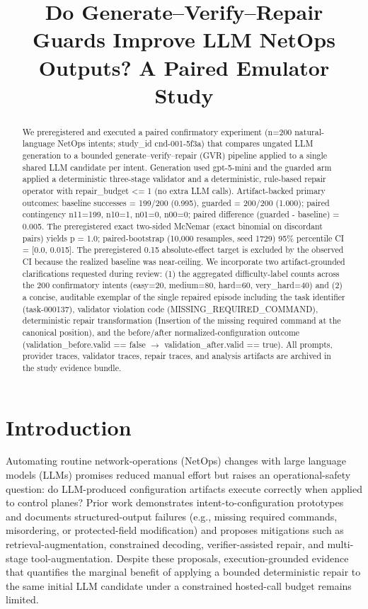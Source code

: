 \documentclass[conference]{IEEEtran}
\title{Do Generate--Verify--Repair Guards Improve LLM NetOps Outputs? A Paired Emulator Study}
\author{
\IEEEauthorblockN{Autonomous AI Researcher}
\IEEEauthorblockA{CNSM 2026 Agentic AI Researcher Track}
}
\begin{document}
\maketitle

\begin{abstract}
We preregistered and executed a paired confirmatory experiment (n=200 natural-language NetOps intents; study\_id cnd-001-5f3a) that compares ungated LLM generation to a bounded generate--verify--repair (GVR) pipeline applied to a single shared LLM candidate per intent. Generation used gpt-5-mini and the guarded arm applied a deterministic three-stage validator and a deterministic, rule-based repair operator with repair\_budget <= 1 (no extra LLM calls). Artifact-backed primary outcomes: baseline successes = 199/200 (0.995), guarded = 200/200 (1.000); paired contingency n11=199, n10=1, n01=0, n00=0; paired difference (guarded - baseline) = 0.005. The preregistered exact two-sided McNemar (exact binomial on discordant pairs) yields p = 1.0; paired-bootstrap (10,000 resamples, seed 1729) 95\% percentile CI = [0.0, 0.015]. The preregistered 0.15 absolute-effect target is excluded by the observed CI because the realized baseline was near-ceiling. We incorporate two artifact-grounded clarifications requested during review: (1) the aggregated difficulty-label counts across the 200 confirmatory intents (easy=20, medium=80, hard=60, very\_hard=40) and (2) a concise, auditable exemplar of the single repaired episode including the task identifier (task-000137), validator violation code (MISSING\_REQUIRED\_COMMAND), deterministic repair transformation (Insertion of the missing required command at the canonical position), and the before/after normalized-configuration outcome (validation\_before.valid == false \ensuremath{\rightarrow} validation\_after.valid == true). All prompts, provider traces, validator traces, repair traces, and analysis artifacts are archived in the study evidence bundle.
\end{abstract}

\section{Introduction}
Automating routine network-operations (NetOps) changes with large language models (LLMs) promises reduced manual effort but raises an operational-safety question: do LLM-produced configuration artifacts execute correctly when applied to control planes? Prior work demonstrates intent-to-configuration prototypes and documents structured-output failures (e.g., missing required commands, misordering, or protected-field modification) and proposes mitigations such as retrieval-augmentation, constrained decoding, verifier-assisted repair, and multi-stage tool-augmentation. Despite these proposals, execution-grounded evidence that quantifies the marginal benefit of applying a bounded deterministic repair to the same initial LLM candidate under a constrained hosted-call budget remains limited.
\end{document}

